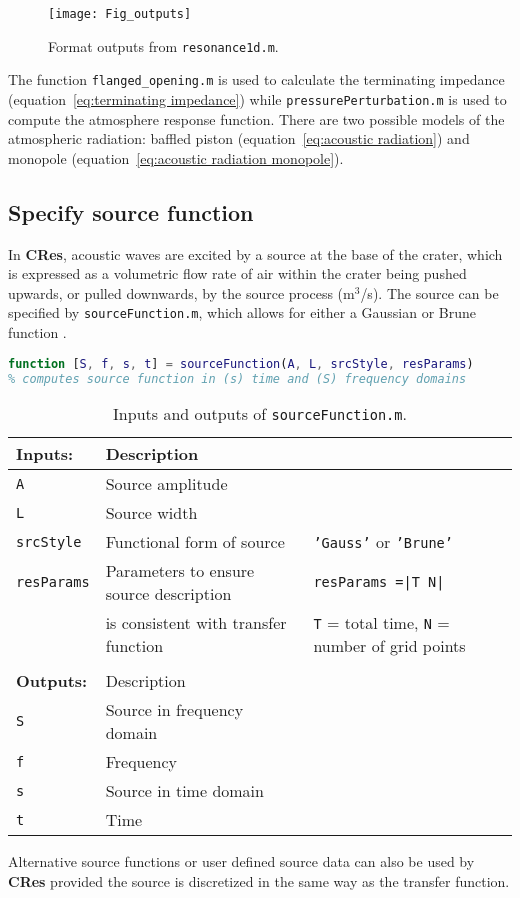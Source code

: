 \documentclass[10pt]{article}
\begin{document}
\begin{figure}[h!]
\centering
\texttt{[image: Fig\_outputs]}
\caption{Format outputs from \texttt{resonance1d.m}.}
\label{fig:outputs}
\end{figure}

The function \texttt{flanged\_opening.m} is used to calculate the terminating impedance (equation~\ref{eq:terminating impedance}) while \texttt{pressurePerturbation.m} is used to compute the atmosphere response function. There are two possible models of the atmospheric radiation: baffled piston (equation~\ref{eq:acoustic radiation}) and monopole (equation~\ref{eq:acoustic radiation monopole}).

\newpage
\subsection{Specify source function}

In {\bf CRes}, acoustic waves are excited by a source at the base of the crater, which is expressed as a volumetric flow rate of air within the crater being pushed upwards, or pulled downwards, by the source process (m$^3$/s). The source can be specified by \texttt{sourceFunction.m}, which allows for either a Gaussian or Brune function \citep{Brune1970}. 
\begin{lstlisting}[language=Matlab]
function [S, f, s, t] = sourceFunction(A, L, srcStyle, resParams)
% computes source function in (s) time and (S) frequency domains
\end{lstlisting}
\begin{table}[h!]
\begin{tabular}{l | ll }
{\bf Inputs:} & Description & \\ \hline
\texttt{A} & Source amplitude & \\
\texttt{L} & Source width & \\
\texttt{srcStyle} & Functional form of source & \texttt{'Gauss'} or \texttt{'Brune'} \\
\texttt{resParams} & Parameters to ensure source description & \texttt{resParams =|T N|} \\
& is consistent with transfer function &  \texttt{T} = total time, \texttt{N} = number of grid points\\
\hline 
\\[-0.2cm]
{\bf Outputs:} & Description & \\ \hline
\texttt{S} &  Source in frequency domain &  \\
\texttt{f} & Frequency &  \\
\texttt{s} & Source in time domain &  \\
\texttt{t} &  Time &  \\
\end{tabular}
\caption{Inputs and outputs of \texttt{sourceFunction.m}.}
\end{table}
Alternative source functions or user defined source data can also be used by {\bf CRes} provided the source is discretized in the same way as the transfer function. 
\end{document}
